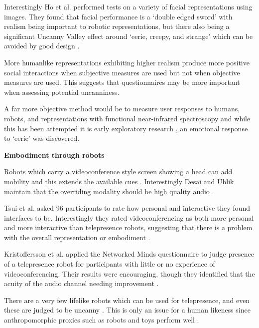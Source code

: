                    Interestingly Ho et al. performed tests on a variety of facial representations using images.  They found that facial performance is a `double edged sword' with realism being important to robotic representations, but there also being a significant Uncanny Valley effect around `eerie, creepy, and strange' which can be avoided by good design \cite{Ho2008}.\par
                    More humanlike representations exhibiting higher realism produce more positive social interactions when subjective measures are used \cite{Yee2007} but not when objective measures are used. This suggests that questionnaires may be more important when assessing potential uncanniness.\par
                    A far more objective method would be to measure user responses to humans, robots, and representations with functional near-infrared spectroscopy and while this has been attempted it is early exploratory research \cite{Strait2014}, an emotional response to `eerie' was discovered.\par
                    
\textbf{Embodiment through robots}

                    Robots which carry a videoconference style screen showing a head can add mobility and this extends the available cues \cite{Adalgeirsson2010, Lee2011, Tsui2011, Paulos1998, Kristoffersson2013}. Interestingly Desai and Uhlik maintain that the overriding modality should be high quality audio \cite{Desai2011}.\par
                    Tsui et al. asked 96 participants to rate how personal and interactive they found interfaces to be. Interestingly they rated videoconferencing as both more personal and more interactive than telepresence robots, suggesting that there is a problem with the overall representation or embodiment \cite{Tsui2012}.\par
                    Kristoffersson et al. applied the Networked Minds questionnaire to judge presence of a telepresence robot for participants with little or no experience of videoconferencing. Their results were encouraging, though they identified that the acuity of the audio channel needing improvement \cite{Kristoffersson2011}.\par
                    There are a very few lifelike robots which can be used for telepresence, and even these are judged to be uncanny \cite{Sakamoto2007}. This is only an issue for a human likeness since anthropomorphic proxies such as robots and toys perform well \cite{Mori1970}.\par
                    
